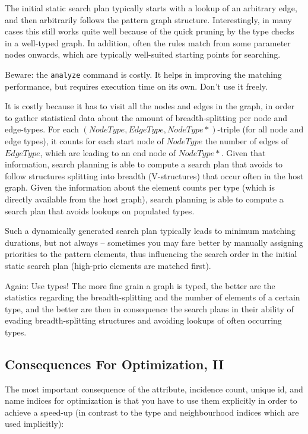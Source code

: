 The initial static search plan typically starts with a lookup of an arbitrary edge, and then arbitrarily follows the pattern graph structure.
Interestingly, in many cases this still works quite well because of the quick pruning by the type checks in a well-typed graph.
In addition, often the rules match from some parameter nodes onwards, which are typically well-suited starting points for searching.

Beware: the \texttt{analyze} command is costly.
It helps in improving the matching performance, but requires execution time on its own.
Don't use it freely.

It is costly because it has to visit all the nodes and edges in the graph,
in order to gather statistical data about the amount of breadth-splitting per node and edge-types. 
For each $(NodeType, EdgeType, NodeType\ast)$-triple (for all node and edge types), it counts for each start node of $NodeType$ the number of edges of $EdgeType$, which are leading to an end node of $NodeType\ast$.
Given that information, search planning is able to compute a search plan that avoids to follow structures splitting into breadth (V-structures) that occur often in the host graph.
Given the information about the element counts per type (which is directly available from the host graph), 
search planning is able to compute a search plan that avoids lookups on populated types.

Such a dynamically generated search plan typically leads to minimum matching durations, but not always -- sometimes you may fare better by manually assigning priorities to the pattern elements, thus influencing the search order in the initial static search plan (high-prio elements are matched first).

Again: Use types!
The more fine grain a graph is typed, the better are the statistics regarding the breadth-splitting and the number of elements of a certain type, and the better are then in consequence the search plans in their ability of evading breadth-splitting structures and avoiding lookups of often occurring types.


\subsection{Consequences For Optimization, II}

The most important consequence of the attribute, incidence count, unique id, and name indices for optimization is that you have to use them explicitly in order to achieve a speed-up (in contrast to the type and neighbourhood indices which are used implicitly):

